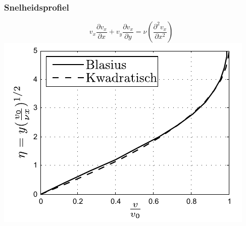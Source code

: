 \documentclass[t]{beamer}
\begin{document}
  	\begin{frame}
		\frametitle{Snelheidsprofiel}
		\begin{equation*}
			v_x \frac{\partial v_x}{\partial x} + v_y \frac{\partial v_x}{\partial y} = \nu \left( \frac{\partial^2 v_x}{\partial x^2} \right)
		\end{equation*}
		\pause
		\center
		\includegraphics{../fig/uitwendige_stroming/Grenslaagsnelheid}
  	\end{frame}
\end{document}
